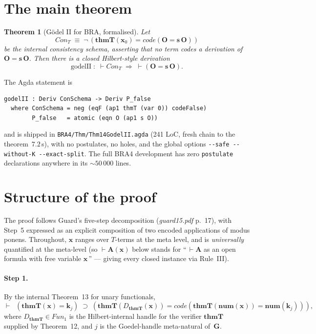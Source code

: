 \documentclass[11pt]{article}
\theoremstyle{plain}
\newtheorem{theorem}{Theorem}[section]
\theoremstyle{definition}
\theoremstyle{remark}
\newcommand{\code}[1]{\mathit{code}(#1)}
\newcommand{\thmT}{\mathbf{thmT}}
\newcommand{\num}{\mathbf{num}}
\newcommand{\Fun}{\mathit{Fun}}
\newcommand{\Con}{\mathit{Con}}
\begin{document}
\section{The main theorem}

\begin{theorem}[G\"odel II for BRA, formalised]
\label{thm:godelII}
Let
\[
\Con_T \;\equiv\; \neg\,(\thmT(\mathbf{x}_0) = \code{\mathbf{O} = \mathbf{s}\,\mathbf{O}})
\]
be the internal consistency schema, asserting that no term codes a
derivation of $\mathbf{O} = \mathbf{s}\,\mathbf{O}$.  Then there is a
closed Hilbert-style derivation
\[
\mathrm{godelII} \;:\; \vdash \Con_T \;\Longrightarrow\; \vdash (\mathbf{O} = \mathbf{s}\,\mathbf{O}).
\]
\end{theorem}

\noindent
The Agda statement is
\begin{lstlisting}
godelII : Deriv ConSchema -> Deriv P_false
  where ConSchema = neg (eqF (ap1 thmT (var 0)) codeFalse)
        P_false   = atomic (eqn O (ap1 s O))
\end{lstlisting}
and is shipped in \verb|BRA4/Thm/Thm14GodelII.agda| (241 LoC, fresh
chain to the theorem~$7.2$\,s), with no postulates, no holes, and the
global options \verb|--safe --without-K --exact-split|.  The full BRA4
development has zero \verb|postulate| declarations anywhere in its
$\sim 50\,000$ lines.

\section{Structure of the proof}

The proof follows Guard's five-step decomposition (\emph{guard15.pdf}
p.~17), with Step~5 expressed as an explicit composition of two encoded
applications of modus ponens.  Throughout, $\mathbf{x}$ ranges over
$T$-terms at the meta level, and is \emph{universally} quantified at
the meta-level (so $\vdash \mathbf{A}(\mathbf{x})$ below stands for
``\,$\vdash \mathbf{A}$ as an open formula with free variable
$\mathbf{x}$\,'' --- giving every closed instance via Rule~III).

\paragraph{Step 1.}  By the internal Theorem~13 for unary functionals,
\[
\vdash \;\;(\thmT(\mathbf{x}) = \mathbf{k}_j) \;\supset\; (\thmT(D_\thmT(\mathbf{x})) = \code{\thmT(\num(\mathbf{x})) = \num(\mathbf{k}_j)}),
\]
where $D_\thmT \in \Fun_1$ is the Hilbert-internal handle for the
verifier $\thmT$ supplied by Theorem~12, and $j$ is the Goedel-handle
meta-natural of~$\mathbf{G}$.
\end{document}
